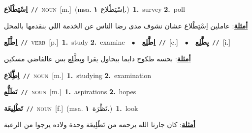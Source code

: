 \documentclass[10pt,a4paper,twoside]{article} %
\begin{document}
\begin{multicols}{2}
{\setlength\topsep{0pt}\textbf{\foreignlanguage{arabic}{اِسْتِطْلَاع}}\ {\color{gray}\texttt{//}\color{black}}\ \textsc{noun}\ [m.]\ \color{gray}(msa. \foreignlanguage{arabic}{اِسْتِطْلاع}~\foreignlanguage{arabic}{\textbf{١.}})\color{black}\ \textbf{1.}~survey  \textbf{2.}~poll\  \begin{flushright}\color{gray}\foreignlanguage{arabic}{\textbf{\underline{\foreignlanguage{arabic}{أمثلة}}}: عاملين اِسْتِطْلاع عشان نشوف مدى رضا الناس عن الخدمة اللي بنقدمها بالمحل}\end{flushright}\color{black}} \vspace{2mm}

{\setlength\topsep{0pt}\textbf{\foreignlanguage{arabic}{اِطَّلَع}}\ {\color{gray}\texttt{//}\color{black}}\ \textsc{verb}\ [p.]\ \textbf{1.}~study  \textbf{2.}~examine\ \ $\bullet$\ \ \setlength\topsep{0pt}\textbf{\foreignlanguage{arabic}{اِطَّلِع}}\ {\color{gray}\texttt{//}\color{black}}\ [c.]\ \ $\bullet$\ \ \setlength\topsep{0pt}\textbf{\foreignlanguage{arabic}{يِطَّلِع}}\ {\color{gray}\texttt{//}\color{black}}\ [i.]\  \begin{flushright}\color{gray}\foreignlanguage{arabic}{\textbf{\underline{\foreignlanguage{arabic}{أمثلة}}}: بحسه طكوح دايما بيحاول يقرا ويِطَّلِع بس عالفاضي مسكين}\end{flushright}\color{black}} \vspace{2mm}

{\setlength\topsep{0pt}\textbf{\foreignlanguage{arabic}{اِطَِّّلَاع}}\ {\color{gray}\texttt{//}\color{black}}\ \textsc{noun}\ [m.]\ \textbf{1.}~studying  \textbf{2.}~examination\ } \vspace{2mm}

{\setlength\topsep{0pt}\textbf{\foreignlanguage{arabic}{تَطَلُّع}}\ {\color{gray}\texttt{//}\color{black}}\ \textsc{noun}\ [m.]\ \textbf{1.}~aspirations  \textbf{2.}~hopes\ } \vspace{2mm}

{\setlength\topsep{0pt}\textbf{\foreignlanguage{arabic}{تَطْلِيعَة}}\ {\color{gray}\texttt{//}\color{black}}\ \textsc{noun}\ [f.]\ \color{gray}(msa. \foreignlanguage{arabic}{نَظْرَة}~\foreignlanguage{arabic}{\textbf{١.}})\color{black}\ \textbf{1.}~look\  \begin{flushright}\color{gray}\foreignlanguage{arabic}{\textbf{\underline{\foreignlanguage{arabic}{أمثلة}}}: كان جارنا الله يرحمه من تَطْلِيعَة وحدة ولاده يرجوا من الرعبة}\end{flushright}\color{black}} \vspace{2mm}


\end{multicols}
\end{document}
